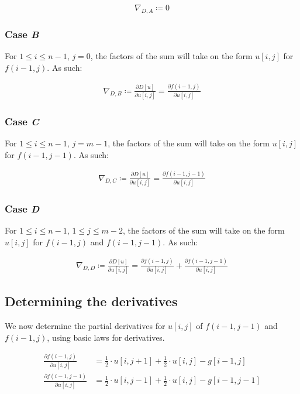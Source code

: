 \documentclass[a4paper]{scrreprt}
\begin{document}
\[
		\nabla_{D, A} \coloneqq 0
\]


\subsubsection{Case \emph{B}}

For $1 \leq i \leq n-1$, $j = 0$, the factors of the sum will take on the form
$u[i, j]$ for $f(i - 1, j)$. As such:

\begin{align*}
		\nabla_{D, B} \coloneqq \frac{\partial D[u]}{\partial u[i, j]} = \frac{\partial f(i - 1, j)}{\partial u[i, j]}
\end{align*}


\subsubsection{Case \emph{C}}

For $1 \leq i \leq n-1$, $j = m - 1$, the factors of the sum will take on the form
$u[i, j]$ for $f(i - 1, j - 1)$. As such:

\begin{align*}
		\nabla_{D, C} \coloneqq \frac{\partial D[u]}{\partial u[i, j]} = \frac{\partial f(i - 1, j - 1)}{\partial u[i, j]}
\end{align*}


\subsubsection{Case \emph{D}}

For $1 \leq i \leq n-1$, $1 \leq j \leq m - 2$, the factors of the sum will
take on the form $u[i, j]$ for $f(i - 1, j)$ and $f(i - 1, j - 1)$. As such:

\begin{align*}
		\nabla_{D, D} \coloneqq \frac{\partial D[u]}{\partial u[i, j]} = \frac{\partial f(i - 1, j)}{\partial u[i, j]} + \frac{\partial f(i - 1, j - 1)}{\partial u[i, j]}
\end{align*}

\subsection{Determining the derivatives}

We now determine the partial derivatives for $u[i, j]$ of $f(i - 1, j - 1)$ and
$f(i - 1, j)$, using basic laws for derivatives.

\begin{align*}
		\frac{\partial f(i - 1, j)}{\partial u[i, j]} & =
		\frac{1}{2} \cdot u[i, j + 1] + \frac{1}{2} \cdot u[i, j] - g[i - 1, j] \\
		\frac{\partial f(i - 1, j - 1)}{\partial u[i, j]} & =
		\frac{1}{2} \cdot u[i, j - 1] + \frac{1}{2} \cdot u[i, j] - g[i - 1, j - 1]
\end{align*}
\end{document}
